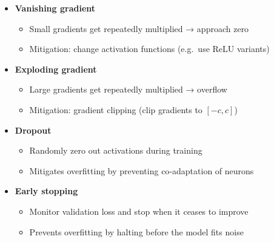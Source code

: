 \documentclass[8pt,twocolumn]{article}
\begin{document}
\begin{itemize}
    \setlength{\itemsep}{0pt}
    \setlength{\parskip}{0pt}
    \item \textbf{Vanishing gradient}\vspace{-0.6em}
      \begin{itemize}
        \setlength{\itemsep}{0pt}
        \setlength{\parskip}{0pt}
        \item Small gradients get repeatedly multiplied → approach zero
        \item Mitigation: change activation functions (e.g.\ use ReLU variants)
      \end{itemize}
    \item \textbf{Exploding gradient}\vspace{-0.6em}
      \begin{itemize}
        \setlength{\itemsep}{0pt}
        \setlength{\parskip}{0pt}
        \item Large gradients get repeatedly multiplied → overflow
        \item Mitigation: gradient clipping (clip gradients to \([-c, c]\))
      \end{itemize}
    \item \textbf{Dropout}\vspace{-0.6em}
      \begin{itemize}
        \setlength{\itemsep}{0pt}
        \setlength{\parskip}{0pt}
        \item Randomly zero out activations during training
        \item Mitigates overfitting by preventing co‐adaptation of neurons
      \end{itemize}
    \item \textbf{Early stopping}\vspace{-0.6em}
      \begin{itemize}
        \setlength{\itemsep}{0pt}
        \setlength{\parskip}{0pt}
        \item Monitor validation loss and stop when it ceases to improve
        \item Prevents overfitting by halting before the model fits noise
      \end{itemize}\vspace{-0.6em}
  \end{itemize}\vspace{-0.6em}
  
\end{document}
